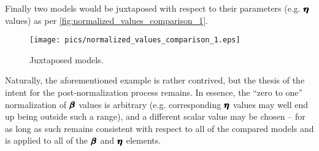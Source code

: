 \documentclass[12pt,a4paper]{article}
\begin{document}
Finally two models would be juxtaposed with respect to their parameters (e.g. \(\pmb{\hm{\eta}}\) values) as per \autoref{fig:normalized_values_comparison_1}. 


\begin{figure}[H]
\begin{framed}
\texttt{[image: pics/normalized\_values\_comparison\_1.eps]}
\caption{Juxtaposed models.} 
\label{fig:normalized_values_comparison_1}
\end{framed}
\end{figure}


Naturally, the aforementioned example is rather contrived, but the thesis of the intent for the post-normalization process remains. In essence, the ``zero to one'' normalization of \( \pmb{\hm{\beta}} \) values is arbitrary (e.g. corresponding \( \pmb{\hm{\eta}} \) values may well end up being outside such a range), and a different scalar value may be chosen -- for as long as such remains consistent with respect to all of the compared models and is applied to all of the  \( \pmb{\hm{\beta}} \) and \( \pmb{\hm{\eta}} \) elements.
\end{document}

